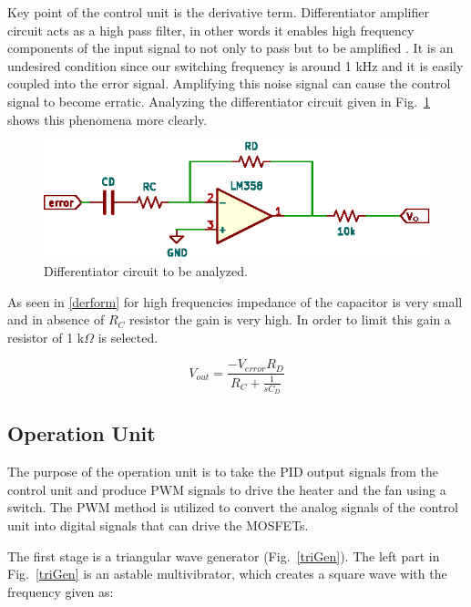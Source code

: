 \documentclass[conference]{IEEEtran}
\begin{document}
Key point of the control unit is the derivative term. Differentiator amplifier circuit acts as a high pass filter, in other words it enables high frequency components of the input signal to not only to pass but to be amplified \cite{b4}. It is an undesired condition since our switching frequency is around 1 kHz and it is easily coupled into the error signal. Amplifying this noise signal can cause the control signal to become erratic. Analyzing the differentiator circuit given in Fig.~\ref{diffe} shows this phenomena more clearly.


\begin{figure}[h]
    \centering
    \includegraphics[scale=1]{figures/derivative.eps}
    \caption{Differentiator circuit to be analyzed.}
    \label{diffe}
\end{figure}





As seen in \eqref{derform} for high frequencies impedance of the capacitor is very small and in absence of $R_C$ resistor the gain is very high. In order to limit this gain a resistor of 1 k$\Omega$ is selected. 


\begin{equation}
V_{out} =\frac{-V_{error}R_D}{R_C + \frac{1}{sC_D}}\label{derform}
\end{equation}






\subsection{Operation Unit}

The purpose of the operation unit is to take the PID output signals from the control unit and produce PWM signals to drive the heater and the fan using a switch. The PWM method is utilized to convert the analog signals of the control unit into digital signals that can drive the MOSFETs. 

The first stage is a triangular wave generator (Fig.~\ref{triGen}). The left part in Fig.~\ref{triGen} is an astable multivibrator, which creates a square wave with the frequency given as:
\end{document}
